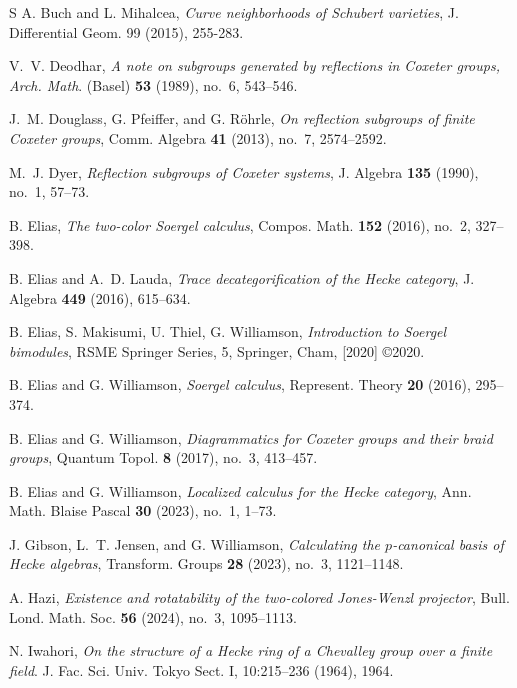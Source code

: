 \documentclass{amsart}
\theoremstyle{definition}
\numberwithin{equation}{subsection}
\begin{document}
\begin{thebibliography}{S}
        A. Buch and L. Mihalcea, \emph{Curve neighborhoods of Schubert varieties}, J. Differential Geom. 99 (2015), 255-283.

        V.~V. Deodhar, \emph{A note on subgroups generated by reflections in Coxeter groups, Arch. Math}. (Basel) {\bf 53} (1989), no.~6, 543--546.

        J.~M. Douglass, G. Pfeiffer, and G. R\"ohrle, \emph{On reflection subgroups of finite Coxeter groups}, Comm. Algebra {\bf 41} (2013), no.~7, 2574--2592.

        M.~J. Dyer, \emph{Reflection subgroups of Coxeter systems}, J. Algebra {\bf 135} (1990), no.~1, 57--73.

        B. Elias, \emph{The two-color Soergel calculus}, Compos. Math. {\bf 152} (2016), no.~2, 327--398.

        B. Elias and A.~D. Lauda, \emph{Trace decategorification of the Hecke category}, J. Algebra {\bf 449} (2016), 615--634.

        B. Elias, S. Makisumi, U. Thiel, G. Williamson, {\it Introduction to Soergel bimodules}, RSME Springer Series, 5, Springer, Cham, [2020] \copyright 2020.

        B. Elias and G. Williamson, \emph{Soergel calculus}, Represent. Theory {\bf 20} (2016), 295--374.

        B. Elias and G. Williamson, \emph{Diagrammatics for Coxeter groups and their braid groups}, Quantum Topol. {\bf 8} (2017), no.~3, 413--457.

        B. Elias and G. Williamson, \emph{Localized calculus for the Hecke category}, Ann. Math. Blaise Pascal {\bf 30} (2023), no.~1, 1--73.    

        J. Gibson, L.~T. Jensen, and G. Williamson, \emph{Calculating the $p$-canonical basis of Hecke algebras}, Transform. Groups {\bf 28} (2023), no.~3, 1121--1148.

        A. Hazi, \emph{Existence and rotatability of the two-colored Jones-Wenzl projector}, Bull. Lond. Math. Soc. {\bf 56} (2024), no.~3, 1095--1113.

        N. Iwahori, \emph{On the structure of a Hecke ring of a Chevalley group over a finite field}. J. Fac. Sci. Univ. Tokyo Sect. I, 10:215–236 (1964), 1964.


\end{thebibliography}
\end{document}
